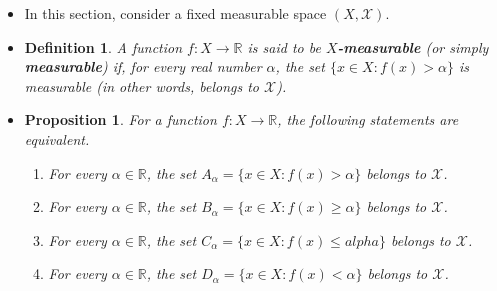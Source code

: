 \documentclass[10pt]{article}
\newtheorem{definition}[lemma]{Definition}
\newtheorem{proposition}[lemma]{Proposition}
\newcommand{\mcal}[1]{\mathcal{#1}}
\newcommand{\Real}{\mathbb{R}}
\begin{document}
\begin{itemize}
  \item In this section, consider a fixed measurable space $(X,\mcal{X})$.
  
  \item \begin{definition}
    A function $f: X \rightarrow \Real$ is said to be {\bf $X$-measurable} (or simply {\bf measurable}) if, for every real number $\alpha$, the set $\{ x \in X : f(x) > \alpha \}$ is measurable (in other words, belongs to $\mcal{X}$).
  \end{definition}

  \item \begin{proposition}
  For a function $f: X \rightarrow \Real$, the following statements are equivalent.
  \begin{enumerate}
    \item[(a)] For every $\alpha \in \Real$, the set $A_\alpha = \{ x \in X : f(x) > \alpha \}$ belongs to $\mcal{X}$.
    \item[(b)] For every $\alpha \in \Real$, the set $B_\alpha = \{ x \in X : f(x) \geq \alpha \}$ belongs to $\mcal{X}$.
    \item[(c)] For every $\alpha \in \Real$, the set $C_\alpha = \{ x \in X : f(x) \leq alpha \}$ belongs to $\mcal{X}$.
    \item[(d)] For every $\alpha \in \Real$, the set $D_\alpha = \{ x \in X : f(x) < \alpha \}$ belongs to $\mcal{X}$. 
  \end{enumerate}
  \end{proposition}
\end{itemize}


  
\end{document}
